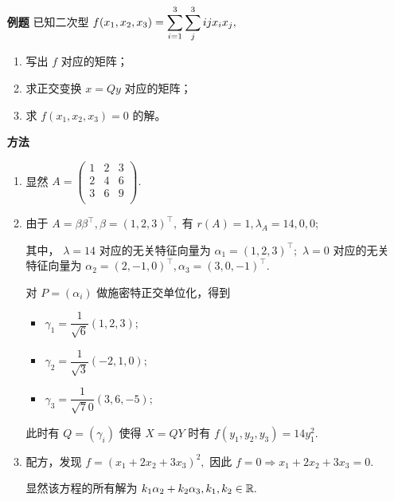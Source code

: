 \begin{itemize}
    \item[\textbf{例题}] 已知二次型 $ \displaystyle f(x_1,x_2,x_3) = \sum_{i = 1}^3\sum_{j}^3 ijx_ix_j, $ 
    \begin{enumerate}[label = \Roman*.]
        \item 写出 $ f $ 对应的矩阵；
        \item 求正交变换 $ x = Qy $ 对应的矩阵；
        \item 求 $ f(x_1,x_2,x_3) = 0 $ 的解。
    \end{enumerate}
    \item[\textbf{方法}]
    \begin{enumerate}[label = \Roman*.]
        \item 显然 $ A = \begin{pmatrix}
            1&2&3\\2&4&6\\3&6&9\\
        \end{pmatrix}. $ 
        \item 由于 $ A = \beta\beta^\top, \beta = (1,2,3)^\top, $ 有 
        $ r(A) = 1,\lambda_A = 14,0,0;$ 
        
        其中， $  \lambda = 14 $ 对应的无关特征向量为
        $ \alpha_1 = (1,2,3)^\top; $ 
        $ \lambda = 0 $ 对应的无关特征向量为 $ \alpha_2 = (2,-1,0)^\top,\alpha_3 = (3,0,-1)^\top. $ 

        对 $ P = (\alpha_i) $ 做施密特正交单位化，得到 
        \begin{itemize}
            \item $ \gamma_1 = \dfrac{1}{\sqrt 6}(1,2,3); $ 
            \item $ \gamma_2 = \dfrac{1}{\sqrt 3}(-2,1,0); $ 
            \item $ \gamma_3 = \dfrac{1}{\sqrt 70}(3,6,-5); $ 
        \end{itemize}

        此时有 $ Q = (\gamma_i) $ 使得 $ X = QY $ 时有 $ f(y_1,y_2,y_3) = 14y^2_1. $ 
        \item 配方，发现 $ f = (x_1+2x_2 + 3x_3)^2, $ 因此
        $ f = 0 \Rightarrow x_1 + 2x_2 +3x_3 = 0. $ 

        显然该方程的所有解为 $ k_1\alpha_2 + k_2\alpha_3, k_1,k_2\in \mathbb R. $ 
    \end{enumerate}
\end{itemize}

